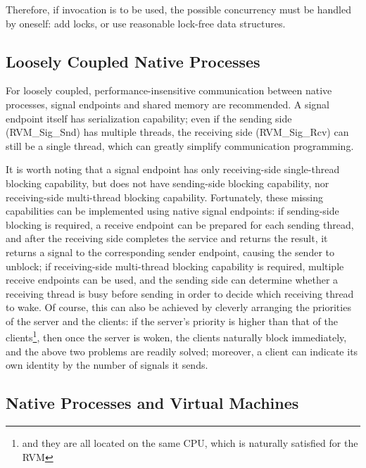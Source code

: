 Therefore, if invocation is to be used, the possible concurrency must be handled by oneself: add locks, or use reasonable lock-free data structures.

\subsection{Loosely Coupled Native Processes}\label{subsec:6-4-2}

For loosely coupled, performance-insensitive communication between native processes, signal endpoints and shared memory are recommended. A signal endpoint itself has serialization capability; even if the sending side (RVM\_Sig\_Snd) has multiple threads, the receiving side (RVM\_Sig\_Rcv) can still be a single thread, which can greatly simplify communication programming.

It is worth noting that a signal endpoint has only receiving-side single-thread blocking capability, but does not have sending-side blocking capability, nor receiving-side multi-thread blocking capability. Fortunately, these missing capabilities can be implemented using native signal endpoints: if sending-side blocking is required, a receive endpoint can be prepared for each sending thread, and after the receiving side completes the service and returns the result, it returns a signal to the corresponding sender endpoint, causing the sender to unblock; if receiving-side multi-thread blocking capability is required, multiple receive endpoints can be used, and the sending side can determine whether a receiving thread is busy before sending in order to decide which receiving thread to wake. Of course, this can also be achieved by cleverly arranging the priorities of the server and the clients: if the server's priority is higher than that of the clients\footnote{and they are all located on the same CPU, which is naturally satisfied for the RVM}, then once the server is woken, the clients naturally block immediately, and the above two problems are readily solved; moreover, a client can indicate its own identity by the number of signals it sends.

\subsection{Native Processes and Virtual Machines}\label{subsec:6-4-3}

